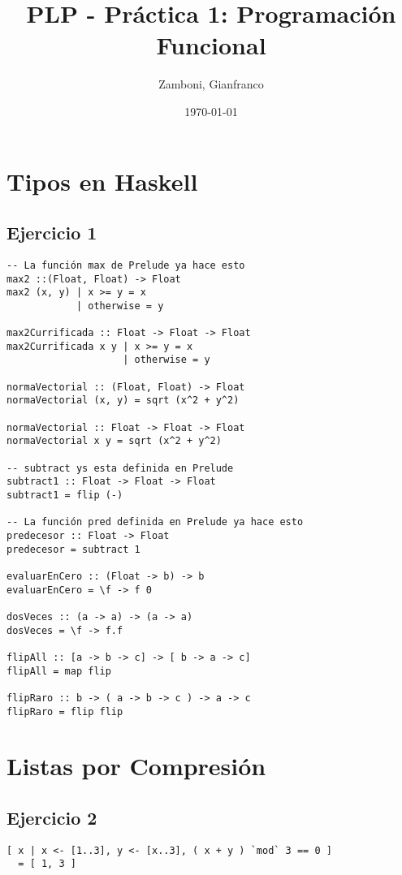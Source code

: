 \documentclass[10pt,a4paper]{article}
\begin{document}
\title{PLP - Práctica 1: Programación Funcional}

\date{\today}

\author{Zamboni, Gianfranco}

\maketitle
\setcounter{page}{1}

\section*{Tipos en Haskell}
\subsection{Ejercicio 1}
\begin{centrado}
\begin{verbatim}
-- La función max de Prelude ya hace esto
max2 ::(Float, Float) -> Float
max2 (x, y) | x >= y = x        
            | otherwise = y

max2Currificada :: Float -> Float -> Float
max2Currificada x y | x >= y = x
                    | otherwise = y

normaVectorial :: (Float, Float) -> Float
normaVectorial (x, y) = sqrt (x^2 + y^2)

normaVectorial :: Float -> Float -> Float
normaVectorial x y = sqrt (x^2 + y^2)

-- subtract ys esta definida en Prelude
subtract1 :: Float -> Float -> Float  
subtract1 = flip (-)

-- La función pred definida en Prelude ya hace esto
predecesor :: Float -> Float  
predecesor = subtract 1

evaluarEnCero :: (Float -> b) -> b
evaluarEnCero = \f -> f 0

dosVeces :: (a -> a) -> (a -> a)
dosVeces = \f -> f.f

flipAll :: [a -> b -> c] -> [ b -> a -> c]
flipAll = map flip

flipRaro :: b -> ( a -> b -> c ) -> a -> c
flipRaro = flip flip
\end{verbatim}
\end{centrado}

\section*{Listas por Compresión}
\subsection{Ejercicio 2}
\begin{centrado}
\begin{verbatim}
[ x | x <- [1..3], y <- [x..3], ( x + y ) `mod` 3 == 0 ] 
  = [ 1, 3 ]
\end{verbatim}
\end{centrado}
\end{document}
